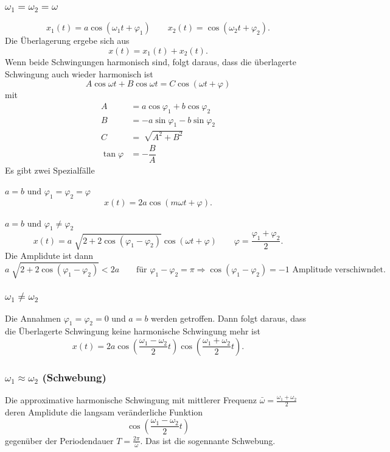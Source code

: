 \documentclass[a4paper,12pt]{article}
\numberwithin{equation}{section}
\begin{document}
\subsubsection{$\omega _1=\omega _2=\omega $}
\[ 
        x_1\left(t\right)=a\cos \left(\omega _1t+\varphi _1\right)\qquad x_2\left(t\right)=\cos \left(\omega _2t+\varphi _2\right)
.\] 
Die Überlagerung ergebe sich aus
\[ 
        x\left(t\right)=x_1\left(t\right)+x_2\left(t\right)
.\] 
Wenn beide Schwingungen harmonisch sind, folgt daraus, dass die überlagerte Schwingung auch wieder harmonisch ist
\[ 
        A\cos \omega t+B\cos \omega t=C\cos \left(\omega t+\varphi \right)
\] 
mit 
\begin{align*} %
        A&=a\cos \varphi _1+b\cos \varphi _2\\
        B&=-a\sin \varphi _1-b\sin \varphi _2\\
        C&=\sqrt[]{A^2+B^2}\\
        \tan \varphi &=-\dfrac{B}{A}
\end{align*}
Es gibt zwei Spezialfälle
\\\hfill\\\textbf{$a=b\text{ und }\varphi _1=\varphi _2=\varphi $}
\[ 
        x\left(t\right)=2a\cos \left(m\omega t+\varphi \right)
.\] 
\hfill\\\textbf{$a=b\text{ und }\varphi _1\neq \varphi _2$}
\[ 
        x\left(t\right)=a\sqrt[]{2+2\cos \left(\varphi _1-\varphi _2\right)}\cos \left(\omega t+\varphi \right)\qquad \varphi =\dfrac{\varphi _1+\varphi _2}{2}
.\] 
Die Amplidute ist dann
\[ 
        a\sqrt[]{2+2\cos \left(\varphi _1-\varphi _2\right)}<2a\qquad \text{für }\varphi _1-\varphi _2=\pi \Rightarrow \cos \left(\varphi _1-\varphi _2\right)=-1\text{ Amplitude verschiwndet}
.\] 

\subsubsection{$\omega _1\neq \omega _2$}
Die Annahmen $\varphi _1=\varphi _2=0$ und $a=b$ werden getroffen. Dann folgt daraus, dass die Überlagerte Schwingung keine harmonische Schwingung mehr ist
\[ 
        x\left(t\right)=2a\cos \left(\dfrac{\omega _1-\omega _2}{2}t\right)\cos \left(\dfrac{\omega _1+\omega _2}{2}t\right)
.\] 

\subsubsection{$\omega _1\approx \omega _2$ (Schwebung)}
Die approximative harmonische Schwingung mit mittlerer Frequenz $\bar{\omega }=\tfrac{\omega _1+\omega _2}{2}$ deren Amplidute die langsam veränderliche Funktion
\[ 
        \cos \left(\dfrac{\omega _1-\omega _2}{2}t\right)
\] 
gegenüber der Periodendauer $T=\tfrac{2\pi }{\bar{\omega }}$. Das ist die sogennante Schwebung.
\end{document}
